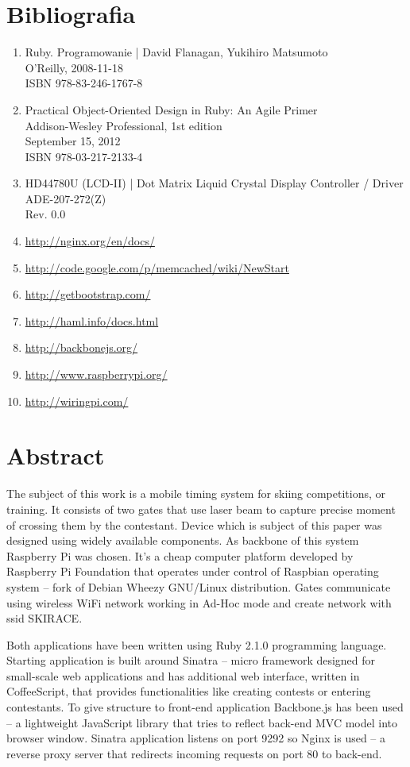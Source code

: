 \documentclass[11pt,a4paper, twoside]{article}
\begin{document}
\section{Bibliografia}
\begin{enumerate}
\item Ruby. Programowanie | David Flanagan, Yukihiro Matsumoto \\ O'Reilly, 2008-11-18 \\ ISBN 978-83-246-1767-8 
\item Practical Object-Oriented Design in Ruby: An Agile Primer \\  Addison-Wesley Professional, 1st edition \\ September 15, 2012 \\ ISBN 978-03-217-2133-4 
\item HD44780U (LCD-II) | Dot Matrix Liquid Crystal Display Controller / Driver \\ ADE-207-272(Z) \\ Rev. 0.0
\item \url{http://nginx.org/en/docs/}
\item \url{http://code.google.com/p/memcached/wiki/NewStart}
\item \url{http://getbootstrap.com/}
\item \url{http://haml.info/docs.html}
\item \url{http://backbonejs.org/}
\item \url{http://www.raspberrypi.org/}
\item \url{http://wiringpi.com/}
\end{enumerate}
\newpage
{}
\section{Abstract}
	The subject of this work is a mobile timing system for skiing competitions, or training. It consists of two gates that use laser beam to capture precise moment of crossing them by the contestant. Device which is subject of this paper was designed using widely available components. As backbone of this system  Raspberry Pi was chosen. It's a cheap computer platform developed by Raspberry Pi Foundation that operates under control of Raspbian operating system – fork of Debian Wheezy GNU/Linux distribution.  Gates communicate using wireless WiFi network working in Ad-Hoc mode and create network with ssid SKIRACE.
	
	Both applications have been written using Ruby 2.1.0 programming language. Starting application is built around Sinatra – micro framework designed for small-scale web applications and has additional web interface, written in CoffeeScript, that provides functionalities like creating contests or entering contestants. To give structure to  front-end application Backbone.js has been used – a lightweight JavaScript library that tries to reflect back-end  MVC model into browser window.  Sinatra application listens on port 9292 so Nginx is used – a reverse proxy server that redirects incoming requests on port 80 to back-end.
	
\end{document}
